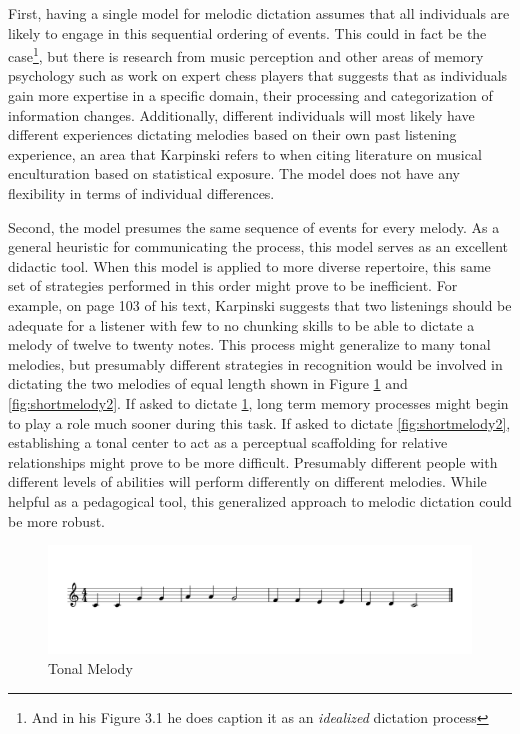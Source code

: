 \documentclass[]{book}
\let\rmarkdownfootnote\footnote%
\def\footnote{\protect\rmarkdownfootnote}
\begin{document}
First, having a single model for melodic dictation assumes that all individuals are likely to engage in this sequential ordering of events.
This could in fact be the case\footnote{And in his Figure 3.1 he does caption it as an \emph{idealized} dictation process}, but there is research from music perception \citep{goldmanImprovisationExperiencePredicts2018a} and other areas of memory psychology such as work on expert chess players \citep{laneChessKnowledgePredicts2018} that suggests that as individuals gain more expertise in a specific domain, their processing and categorization of information changes.
Additionally, different individuals will most likely have different experiences dictating melodies based on their own past listening experience, an area that Karpinski refers to when citing literature on musical enculturation based on statistical exposure.
The model does not have any flexibility in terms of individual differences.

Second, the model presumes the same sequence of events for every melody.
As a general heuristic for communicating the process, this model serves as an excellent didactic tool.
When this model is applied to more diverse repertoire, this same set of strategies performed in this order might prove to be inefficient.
For example, on page 103 of his text, Karpinski suggests that two listenings should be adequate for a listener with few to no chunking skills to be able to dictate a melody of twelve to twenty notes.
This process might generalize to many tonal melodies, but presumably different strategies in recognition would be involved in dictating the two melodies of equal length shown in Figure \ref{fig:shortmelody1} and \ref{fig:shortmelody2}.
If asked to dictate \ref{fig:shortmelody1}, long term memory processes might begin to play a role much sooner during this task.
If asked to dictate \ref{fig:shortmelody2}, establishing a tonal center to act as a perceptual scaffolding for relative relationships might prove to be more difficult.
Presumably different people with different levels of abilities will perform differently on different melodies.
While helpful as a pedagogical tool, this generalized approach to melodic dictation could be more robust.

\begin{figure}

{\centering \includegraphics[width=0.8\linewidth]{img/musicalexamples/MMD_Figure2-1} 

}

\caption{Tonal Melody}\label{fig:shortmelody1}
\end{figure}
\end{document}
